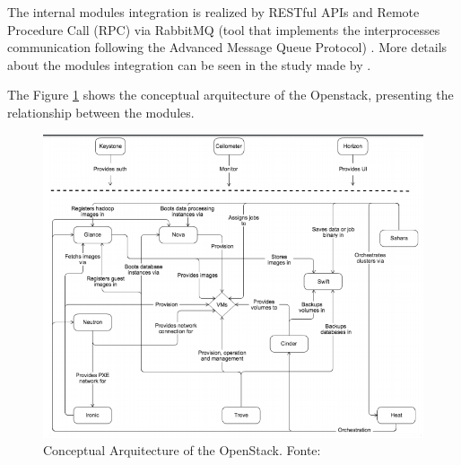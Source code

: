 \documentclass[conference]{IEEEtran}
\begin{document}

The internal modules integration is realized by RESTful APIs and Remote Procedure Call (RPC) via RabbitMQ
(tool that implements the interprocesses communication following the Advanced Message Queue Protocol) \cite{bui2016}. More details about the modules integration can be seen in the study made by  \cite{bui2016}.


The Figure \ref{fig:openstack_architecture} shows the conceptual arquitecture of the Openstack, presenting the relationship between the modules. 

\begin{figure}[ht]
\centering
\includegraphics[width=.5\textwidth]{figuras/openstack_architecture.png}
\caption{Conceptual Arquitecture of the OpenStack. Fonte: \cite{openstack}}
\label{fig:openstack_architecture}
\end{figure}

\end{document}
